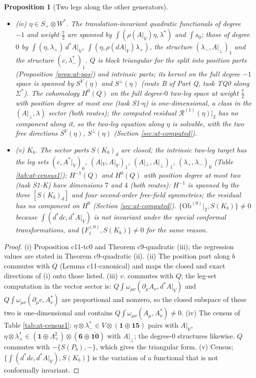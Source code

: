 \documentclass[11pt]{article}
\numberwithin{equation}{section}
\theoremstyle{plain}
\newtheorem{proposition}[theorem]{Proposition}
\theoremstyle{definition}
\newcommand{\Ap}{A|_{\perp}}
\newcommand{\AV}{A|_V}
\newcommand{\Ob}{\mathrm{Ob}}
\begin{document}
\begin{proposition}[Two legs along the other generators]
\begin{itemize}
\item (iv) $\eta\in S_+\otimes W^*$. The translation-invariant quadratic functionals of degree $-1$ and weight $\tfrac72$ are spanned by $\int(\rho(\AV)\eta,\lambda^*)$ and $\int s_0$; those of degree $0$ by $\int(\eta,\lambda_+)\,d^*\AV$, $\int(\eta,\rho(d\AV)\lambda_+)$, the structure $(\lambda_-,\Ap)_1$ and the structure $(c,\lambda^*_-)_1$. $Q$ is block triangular for the split into position parts (Proposition \ref{prop:at-pos}) and intrinsic parts; its kernel on the full degree $-1$ space is spanned by $S^V(\eta)$ and $S^\perp(\eta)$ (route B of Part Q, task TQ0 along $\Sigma^*$). The cohomology $H^0(Q)$ on the full degree-$0$ two-leg space at weight $\tfrac72$ with position degree at most one (task S1-$\eta$) is one-dimensional, a class in the $(\Ap,\lambda)$ sector (both routes); the computed residual $\mathcal R^{(1)}(\eta)|_2$ has no component along it, so the two-leg equation along $\eta$ is solvable, with the two free directions $S^V(\eta)$, $S^\perp(\eta)$ (Section \ref{sec:at-computed}).
\item (v) $K_b$. The sector parts $S(K_b)_d$ are closed; the intrinsic two-leg target has the leg sets $(c,A^*|_V)_0$, $(\AV,\AV)_1$, $(\Ap,\Ap)_1$, $(\lambda_+,\lambda_-)_0$ (Table \ref{tab:at-census1}); $H^{-1}(Q)$ and $H^0(Q)$ with position degree at most two (task S1-K) have dimensions $7$ and $4$ (both routes): $H^{-1}$ is spanned by the three $[S(K_b)_d]$ and four second-order free-field symmetries; the residual has no component on $H^0$ (Section \ref{sec:at-computed}). $\{\Ob^{(0)}|_2,S(K_b)\}\neq0$ because $\int(d^*dc,d^*\AV)$ is not invariant under the special conformal transformations, and $\{F_1^{(0)},S(K_b)\}\neq0$ for the same reason.
\end{itemize}
\end{proposition}

\begin{proof}
(i) Proposition c11-tc0 and Theorem c9-quadratic (iii); the regression values are stated in Theorem c9-quadratic (ii). (ii) The position part along $b$ commutes with $Q$ (Lemma c11-canonical) and maps the closed and exact directions of (i) onto those listed. (iii) $v.$ commutes with $Q$; the leg-set computation in the vector sector is: $Q\int\omega_{\mu\nu}(\partial_\mu A_\nu,d^*\AV)$ and $Q\int\omega_{\mu\nu}(\partial_\mu c,A^*_\nu)$ are proportional and nonzero, so the closed subspace of these two is one-dimensional and contains $Q\int\omega_{\mu\nu}(A_\mu,A^*_\nu)\ne0$. (iv) The census of Table \ref{tab:at-census1}: $\eta\otimes\lambda^*_-\in V\otimes(\mathbf1\oplus\mathbf{15})$ pairs with $\AV$, $\eta\otimes\lambda^*_+\in(\mathbf1\oplus\Lambda^2_+)\otimes(\mathbf6\oplus\overline{\mathbf{10}})$ with $\Ap$; the degree-$0$ structures likewise. $Q$ commutes with $-\{S(P_b),-\}$, which gives the triangular form. (v) Census; $\{\int(d^*dc,d^*\AV),S(K_b)\}$ is the variation of a functional that is not conformally invariant.
\end{proof}
\end{document}
